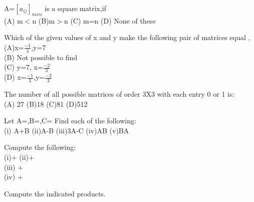 

\item A=$[a_{ij}]_{mxn}$ is a square matrix,if\\
(A) m$<$n (B)m$>$n (C) m=n (D) None of these\\
\item Which of the given values of x and y make the following pair of matrices equal ,\\
(A)x=$\frac{-1}{3}$,y=7 \\
 (B) Not possible to find\\
(C) y=7, x=$\frac{-2}{3}$\\
 (D) x=$\frac{-1}{3}$,y=$\frac{-2}{3}$\\
\item The number of all possible matrices of order 3X3 with each entry 0 or 1 is:\\
(A) 27 (B)18 (C)81 (D)512\\
\item Let A=,B=,C=
Find each of the following:\\
(i) A+B  (ii)A-B  (iii)3A-C  (iv)AB  (v)BA\\
\item Compute the following:\\
(i)+ (ii)+ \\
  (iii) +\\ 
(iv) +\\
\item Compute the indicated products.
